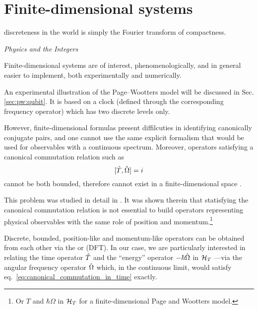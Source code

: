 \section{Finite-dimensional systems}\label{sec:finite-quantum}\label{sec:pw:theory_last}
\epigraph{\textelp{} discreteness in the world is simply the Fourier transform of compactness.}{%
  \emph{Physics and the Integers} \parencite{Tong_Integers}%
}

\noindent
Finite-dimensional systems are of interest, phenomenologically,
and in general easier to implement,
both experimentally and numerically.

An experimental illustration of the Page--Wootters model will be discussed in Sec. \ref{sec:pw:qubit}.
It is based on a clock
(defined through the corresponding frequency operator)
which has two discrete levels only.

However,
finite-dimensional formulas
present diffilcuties in identifying canonically conjugate
pairs, and one cannot use the same explicit formalism
that would be used for observables with a continuous spectrum.
Moreover, operators satisfying a canonical
commutation relation such as
\begin{equation}\label{eq:canonical_commutation_in_time}
  [\hat{T}, \hat{\Omega}] = i
\end{equation}
cannot be both bounded, therefore cannot exist in a finite-dimensional space \parencite{Weyl:FiniteComm}.

This problem was studied in detail in
\cite{FiniteHilb}. It was shown therein
that statisfying the canonical commutation relation
is not essential to build operators representing physical observables
with the same role of position and momentum.\footnote{
  Or $T$ and $\hbar\Omega$
  in $\mathcal{H}_T$ for a finite-dimensional Page and Wootters model.
}

Discrete, bounded, position-like and momentum-like operators can be obtained from
each other via
the  or   (DFT).
In our case, we are particularly interested in relating the
time operator $\hat{T}$ and the ``energy'' operator $-\hbar\hat{\Omega}$
in $\mathcal{H}_T$ ---via the angular frequency operator $\hat{\Omega}$ which, in the continuous limit, would satisfy
eq.~\eqref{eq:canonical_commutation_in_time} exactly.

